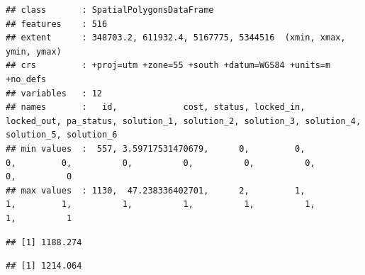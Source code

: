 \documentclass[12pt,]{book}
\newenvironment{Shaded}{\begin{snugshade}}{\end{snugshade}}
\newcommand{\CommentTok}[1]{\textcolor[rgb]{0.56,0.35,0.01}{\textit{#1}}}
\newcommand{\DecValTok}[1]{\textcolor[rgb]{0.00,0.00,0.81}{#1}}
\newcommand{\KeywordTok}[1]{\textcolor[rgb]{0.13,0.29,0.53}{\textbf{#1}}}
\newcommand{\NormalTok}[1]{#1}
\newcommand{\OperatorTok}[1]{\textcolor[rgb]{0.81,0.36,0.00}{\textbf{#1}}}
\newcommand{\StringTok}[1]{\textcolor[rgb]{0.31,0.60,0.02}{#1}}
\begin{document}
\begin{verbatim}
## class       : SpatialPolygonsDataFrame 
## features    : 516 
## extent      : 348703.2, 611932.4, 5167775, 5344516  (xmin, xmax, ymin, ymax)
## crs         : +proj=utm +zone=55 +south +datum=WGS84 +units=m +no_defs 
## variables   : 12
## names       :   id,             cost, status, locked_in, locked_out, pa_status, solution_1, solution_2, solution_3, solution_4, solution_5, solution_6 
## min values  :  557, 3.59717531470679,      0,         0,          0,         0,          0,          0,          0,          0,          0,          0 
## max values  : 1130,  47.238336402701,      2,         1,          1,         1,          1,          1,          1,          1,          1,          1
\end{verbatim}

\begin{Shaded}
\end{Shaded}

\begin{verbatim}
## [1] 1188.274
\end{verbatim}

\begin{Shaded}
\end{Shaded}

\begin{verbatim}
## [1] 1214.064
\end{verbatim}

\begin{Shaded}
\end{Shaded}
\end{document}
